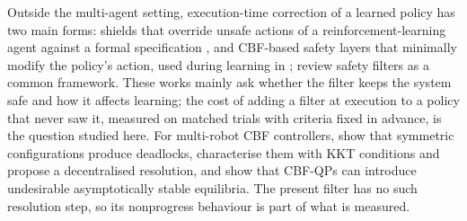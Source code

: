 \documentclass[journal]{IEEEtran}
\begin{document}
Outside the multi-agent setting, execution-time correction of a learned policy has two main forms:
shields that override unsafe actions of a reinforcement-learning agent against a formal specification
\cite{alshiekh2018}, and CBF-based safety layers that minimally modify the policy's action, used during
learning in \cite{cheng2019}; \cite{hsu2024} review safety filters as a common framework. These works
mainly ask whether the filter keeps the system safe and how it affects learning; the cost of adding a
filter at execution to a policy that never saw it, measured on matched trials with criteria fixed in
advance, is the question studied here. For multi-robot CBF controllers, \cite{grover2023} show that
symmetric configurations produce deadlocks, characterise them with KKT conditions and propose a
decentralised resolution, and \cite{reis2021} show that CBF-QPs can introduce undesirable asymptotically
stable equilibria. The present filter has no such resolution step, so its nonprogress behaviour is part
of what is measured.
\end{document}
